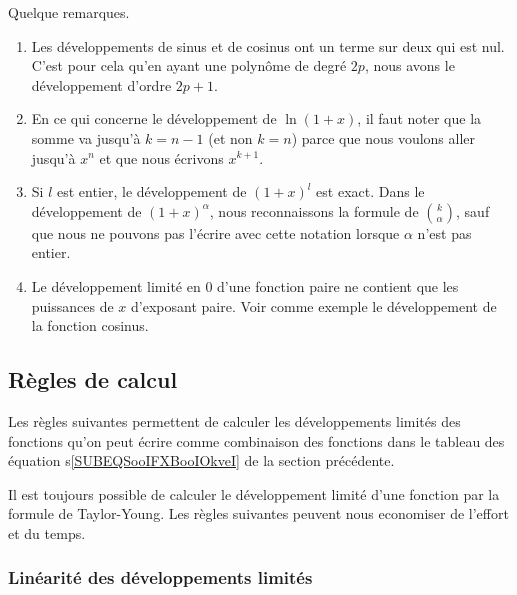 \begin{remark}
  Quelque remarques.
  \begin{enumerate}
  \item
    Les développements de sinus et de cosinus ont un terme sur deux qui est nul. C'est pour cela qu'en ayant une polynôme de degré \( 2p\), nous avons le développement d'ordre \( 2p+1\).
  \item
    En ce qui concerne le développement de \( \ln(1+x)\), il faut noter que la somme va jusqu'à \( k=n-1\) (et non \( k=n\)) parce que nous voulons aller jusqu'à \( x^n\) et que nous écrivons \( x^{k+1}\).
  \item
    Si \( l\) est entier, le développement de \( (1+x)^l\) est exact. Dans le développement de \( (1+x)^{\alpha}\), nous reconnaissons la formule de \( \binom{ k }{\alpha }\), sauf que nous ne pouvons pas l'écrire avec cette notation lorsque \( \alpha\) n'est pas entier.
  \item Le développement limité en $0$ d'une fonction paire ne contient que les puissances de $x$ d'exposant paire. Voir comme exemple le développement de la fonction cosinus.
  \end{enumerate}
\end{remark}

\subsection{Règles de calcul}

Les règles suivantes permettent de calculer les développements limités des fonctions qu'on peut écrire comme combinaison des fonctions dans le tableau des équation s\eqref{SUBEQSooIFXBooIOkveI} de la section précédente. 
\begin{remark}
  Il est toujours possible de calculer le développement limité d'une fonction par la formule de Taylor-Young. Les règles suivantes peuvent nous economiser de l'effort et du temps. 
\end{remark}

\subsubsection{Linéarité des développements limités}

